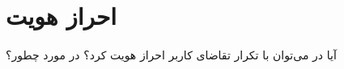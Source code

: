 \documentclass[../main.tex]{subfiles}
\begin{document}
\section{احراز هویت}

\paragraph{}
آیا در  می‌توان با تکرار تقاضای کاربر احراز هویت کرد؟ در مورد  چطور؟
\end{document}
